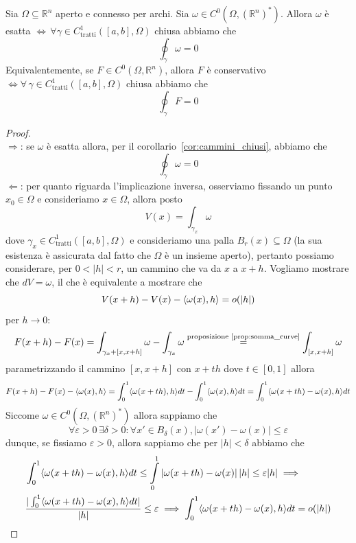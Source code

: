 \begin{theorem}[CF1]
Sia $\Omega \subseteq \mathbb{R}^n$ aperto e connesso per archi. Sia $\omega \in C^0(\Omega, (\mathbb{R}^n)^*)$. Allora $\omega$ è esatta $\iff \, \forall \gamma \in C^1_\text{tratti} ([a, b], \Omega)$ chiusa abbiamo che
$$
\oint_\gamma \omega = 0
$$
Equivalentemente, se $F \in C^0(\Omega, \mathbb{R}^n)$, allora $F$ è conservativo $\iff \forall \, \gamma \in C^1_\text{tratti}([a, b], \Omega)$ chiusa abbiamo che
$$
\oint_\gamma F = 0
$$
\label{thm:teo_cf1}
\end{theorem}
\begin{proof} \hspace{1cm} \\
$\boxed{\Rightarrow}$: se $\omega$ è esatta allora, per il corollario~\ref{cor:cammini_chiusi}, abbiamo che
$$
\oint_\gamma \omega = 0
$$
$\boxed{\Leftarrow}$: per quanto riguarda l'implicazione inversa, osserviamo fissando un punto $x_0 \in \Omega$ e consideriamo $x \in \Omega$, allora posto
$$
V(x) = \int_{\gamma_x} \omega
$$
dove $\gamma_x \in C^1_\text{tratti}([a, b], \Omega)$ e consideriamo una palla $B_r(x) \subseteq \Omega$ (la sua esistenza è assicurata dal fatto che $\Omega$ è un insieme aperto), pertanto possiamo considerare, per $0 < |h| < r$, un cammino che va da $x$ a $x+h$. Vogliamo mostrare che $dV =\omega$, il che è equivalente a mostrare che $$V(x+h) - V(x) - \langle \omega(x), h \rangle = o(|h|)$$ per $h \to 0$:
$$
F(x+h) - F(x) = \int_{\gamma_x + [x, x+h]} \omega - \int_{\gamma_x} \omega \stackrel{\text{proposizione~\ref{prop:somma_curve}}}{=} \int_{[x, x+h]} \omega
$$
parametrizzando il cammino $[x, x+h]$ con $x + th$ dove $t \in [0,1]$ allora
$$
F(x+h)-F(x) - \langle \omega(x), h \rangle = \int_0^1 \langle \omega(x + th), h \rangle dt - \int_0^1 \langle \omega(x), h \rangle dt = \int_0^1 \langle \omega(x + th) - \omega(x), h \rangle dt
$$
Siccome $\omega \in C^0(\Omega, (\mathbb{R}^n)^*)$ allora sappiamo che
$$
\forall \varepsilon > 0 \, \exists \delta > 0: \forall x' \in B_\delta(x), |\omega(x') - \omega(x)| \leq \varepsilon
$$
dunque, se fissiamo $\varepsilon > 0$, allora sappiamo che per $|h| < \delta$ abbiamo che
\begin{align*}
&\int_0^1 \langle \omega(x + th) - \omega(x), h \rangle dt \leq \int\limits_0^1 |\omega(x + th) - \omega(x) | \, |h| \leq \varepsilon |h| \implies \\
&\frac{|\int_0^1 \langle \omega(x + th) - \omega(x), h \rangle dt|}{|h|} \leq \varepsilon \implies \int_0^1 \langle \omega(x + th) - \omega(x), h \rangle dt = o(|h|) 
\end{align*}

\end{proof}

